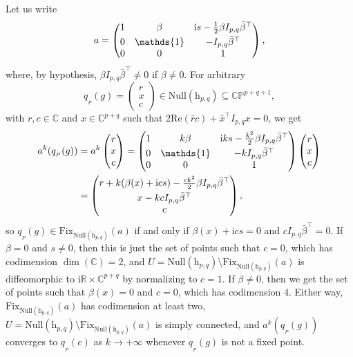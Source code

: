 \documentclass[pdftex]{sigma}
\numberwithin{equation}{section}
\theoremstyle{definition}
\begin{document}
Let us write \[a=\begin{pmatrix}1 & \beta & \mathrm{i}s-\tfrac{1}{2}\beta I_{p,q} \bar{\beta}^\top \vspace{1mm} \\ 0 & \mathds{1} & -I_{p,q}\bar{\beta}^\top \\ 0 & 0 & 1\end{pmatrix},\] where, by hypothesis, $\beta I_{p,q}\bar{\beta}^\top\neq 0$ if $\beta\neq 0$. For arbitrary \[q_{{}_P}(g)=\begin{pmatrix}r \\ x \\ c\end{pmatrix}\in\mathrm{Null}(\mathrm{h}_{p,q})\subseteq\mathbb{CP}^{p+q+1},\] with $r,c\in\mathbb{C}$ and $x\in\mathbb{C}^{p+q}$ such that $2\mathrm{Re}(\bar{r}c)+\bar{x}^\top I_{p,q}x=0$, we get
\begin{align*}a^k(q_{{}_P}(g)) & =a^k\begin{pmatrix}r \\ x \\ c\end{pmatrix}=\begin{pmatrix}1 & k\beta & \mathrm{i}ks-\tfrac{k^2}{2}\beta I_{p,q} \bar{\beta}^\top \vspace{1mm}\\ 0 & \mathds{1} & -kI_{p,q}\bar{\beta}^\top \\ 0 & 0 & 1\end{pmatrix}\begin{pmatrix}r \\ x \\ c\end{pmatrix} \\ & =\begin{pmatrix}r+k(\beta(x)+\mathrm{i}cs)-\tfrac{ck^2}{2}\beta I_{p,q}\bar{\beta}^\top \vspace{1mm}\\ x-kcI_{p,q}\bar{\beta}^\top \\ c\end{pmatrix},
\end{align*} so $q_{{}_P}(g)\in\mathrm{Fix}_{\mathrm{Null}(\mathrm{h}_{p,q})}(a)$ if and only if $\beta(x)+\mathrm{i}cs=0$ and $cI_{p,q}\bar{\beta}^\top=0$.
If $\beta=0$ and $s\neq 0$, then this is just the set of points such that $c=0$, which has codimension $\dim(\mathbb{C})=2$, and $U=\mathrm{Null}(\mathrm{h}_{p,q})\setminus\mathrm{Fix}_{\mathrm{Null}(\mathrm{h}_{p,q})}(a)$ is diffeomorphic to $\mathrm{i}\mathbb{R}\times\mathbb{C}^{p+q}$ by normalizing to $c=1$. If $\beta\neq 0$, then we get the set of points such that $\beta(x)=0$ and $c=0$, which has codimension 4. Either way, $\mathrm{Fix}_{\mathrm{Null}(\mathrm{h}_{p,q})}(a)$ has codimension at least two, $U=\mathrm{Null}(\mathrm{h}_{p,q})\setminus\mathrm{Fix}_{\mathrm{Null}(\mathrm{h}_{p,q})}(a)$ is simply connected, and $a^k(q_{{}_P}(g))$ converges to $q_{{}_P}(e)$ as $k\rightarrow+\infty$ whenever $q_{{}_P}(g)$ is not a fixed point.
\end{document}
